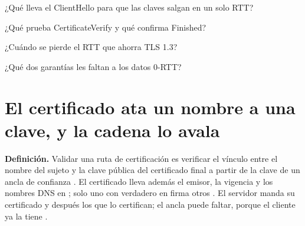 \documentclass[10pt,a4paper]{article}
\begin{document}

\begin{repaso}
\item ¿Qué lleva el ClientHello para que las claves salgan en un solo RTT?
\item ¿Qué prueba CertificateVerify y qué confirma Finished?
\item ¿Cuándo se pierde el RTT que ahorra TLS 1.3?
\item ¿Qué dos garantías les faltan a los datos 0-RTT?
\end{repaso}

\section{El certificado ata un nombre a una clave, y la cadena lo avala}\label{sec:certificados}

\textbf{Definición.} Validar una ruta de certificación es verificar el vínculo entre el
nombre del sujeto y la clave pública del certificado final a partir de la clave de un ancla
de confianza . El certificado lleva además el emisor, la vigencia y los
nombres DNS en  ; solo uno con
 verdadero en  firma otros . El
servidor manda su certificado y después los que lo certifican; el ancla puede faltar, porque
el cliente ya la tiene .
\end{document}
